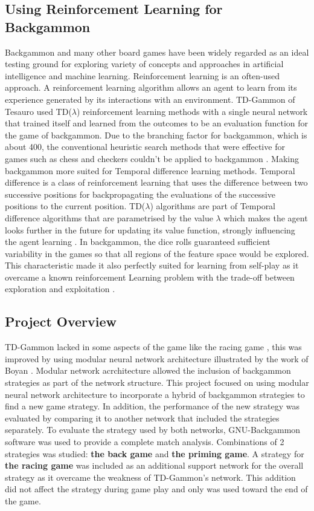 \documentclass[12pt,a4paper]{article}
\begin{document}
\subsection{Using Reinforcement Learning for Backgammon}
Backgammon and many other board games have been widely regarded as an ideal testing ground for exploring variety of concepts and approaches in artificial intelligence and machine learning. Reinforcement learning is an often-used approach. A reinforcement learning algorithm allows an agent to learn from its experience generated by its interactions with an environment. TD-Gammon of Tesauro \citeyear{DBLP:conf/icml/Tesauro92} used TD($\lambda$) reinforcement learning methods with a single neural network that trained itself and learned from the outcomes to be an evaluation function for the game of backgammon. Due to the branching factor for backgammon, which is about 400, the conventional heuristic search methods that were effective for games such as chess and checkers couldn't be applied to backgammon \cite{rl}. Making backgammon more suited for Temporal difference learning methods. Temporal difference is a class of reinforcement learning that uses the difference between two successive positions for backpropagating the evaluations of the successive positions to the current position. TD($\lambda$) algorithms are part of Temporal difference algorithms that are parametrised by the value $\lambda$ which makes the agent looks further in the future for updating its value function, strongly influencing the agent learning \cite{rl}. In backgammon, the dice rolls guaranteed sufficient variability in the games so that all regions of the feature space would be explored. This characteristic made it also perfectly suited for learning from self-play as it overcame a known reinforcement Learning problem with the trade-off between exploration and exploitation \cite{survey}. 

\subsection{Project Overview}
TD-Gammon lacked in some aspects of the game like the racing game \cite{survey}, this was improved by using modular neural network architecture illustrated by the work of Boyan \citeyear{boyan}. Modular network acrchitecture allowed the inclusion of backgammon strategies as part of the network structure. This project focused on using modular neural network architecture to incorporate a hybrid of backgammon strategies to find a new game strategy. In addition, the performance of the new strategy was evaluated by comparing it to another network that included the strategies separately. To evaluate the strategy used by both networks, GNU-Backgammon software was used to provide a complete match analysis. Combinations of 2 strategies was studied: \textbf{the back game} and \textbf{the priming game}. A strategy for \textbf{the racing game} was included as an additional support network for the overall strategy as it overcame the weakness of TD-Gammon's network. This addition did not affect the strategy during game play and only was used toward the end of the game. 
\end{document}

